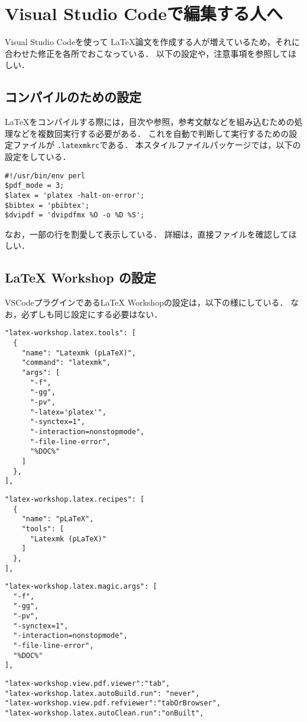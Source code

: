 \documentclass[a4paper,10pt,twocolumn]{jsarticle}
\begin{document}
\section{Visual Studio Codeで編集する人へ}
Visual Studio Codeを使って \LaTeX 論文を作成する人が増えているため，それに合わせた修正を各所でおこなっている．
以下の設定や，注意事項を参照してほしい．

\subsection{コンパイルのための設定}
\LaTeX をコンパイルする際には，目次や参照，参考文献などを組み込むための処理などを複数回実行する必要がある．
これを自動で判断して実行するための設定ファイルが \verb+.latexmkrc+である．
本スタイルファイルパッケージでは，以下の設定をしている．
\begin{screen}
{\small
\begin{verbatim}
#!/usr/bin/env perl
$pdf_mode = 3;
$latex = 'platex -halt-on-error';
$bibtex = 'pbibtex';
$dvipdf = 'dvipdfmx %O -o %D %S';
\end{verbatim}
}
\end{screen}

なお，一部の行を割愛して表示している．
詳細は，直接ファイルを確認してほしい．

\subsection{LaTeX Workshop の設定}
VSCodeプラグインであるLaTeX Workshopの設定は，以下の様にしている．
なお，必ずしも同じ設定にする必要はない．
\begin{screen}
{\footnotesize
\begin{verbatim}
"latex-workshop.latex.tools": [
  {
    "name": "Latexmk (pLaTeX)",
    "command": "latexmk",
    "args": [
      "-f",
      "-gg",
      "-pv",
      "-latex='platex'",
      "-synctex=1",
      "-interaction=nonstopmode",
      "-file-line-error",
      "%DOC%"
    ]
  },
],
\end{verbatim}
}
\end{screen}
\begin{screen}
    {\footnotesize
    \begin{verbatim}
"latex-workshop.latex.recipes": [
  {
    "name": "pLaTeX",
    "tools": [
      "Latexmk (pLaTeX)"
    ]
  },
],
\end{verbatim}
}
\end{screen}
\begin{screen}
{\footnotesize
\begin{verbatim}
"latex-workshop.latex.magic.args": [
  "-f",
  "-gg",
  "-pv",
  "-synctex=1",
  "-interaction=nonstopmode",
  "-file-line-error",
  "%DOC%"
],
\end{verbatim}
}
\end{screen}
\begin{screen}
{\footnotesize
\begin{verbatim}
"latex-workshop.view.pdf.viewer":"tab",
"latex-workshop.latex.autoBuild.run": "never",
"latex-workshop.view.pdf.refviewer":"tabOrBrowser",
"latex-workshop.latex.autoClean.run":"onBuilt",
\end{verbatim}
}
\end{screen}
\end{document}
